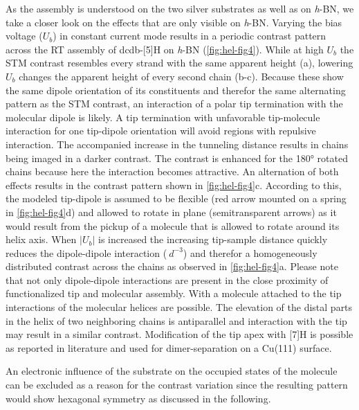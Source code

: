 As the assembly is understood on the two silver substrates as well as on \textit{h}-BN, we take a closer look on the effects that are only visible on \textit{h}-BN. Varying the bias voltage ($U_b$) in constant current mode results in a periodic contrast pattern across the RT assembly of dcdb-[5]H on \textit{h}-BN (\autoref{fig:hel-fig4}). While at high $U_b$ the STM contrast resembles every strand with the same apparent height (a), lowering $U_b$ changes the apparent height of every second chain (b-c). Because these show the same dipole orientation of its constituents and therefor the same alternating pattern as the STM contrast, an interaction of a polar tip termination with the molecular dipole is likely. A tip termination with unfavorable tip-molecule interaction for one tip-dipole orientation will avoid regions with repulsive interaction. The accompanied increase in the tunneling distance results in chains being imaged in a darker contrast. The contrast is enhanced for the 180° rotated chains because here the interaction becomes attractive. An alternation of both effects results in the contrast pattern shown in \autoref{fig:hel-fig4}c. According to this, the modeled tip-dipole is assumed to be flexible (red arrow mounted on a spring in \autoref{fig:hel-fig4}d) and allowed to rotate in plane (semitransparent arrows) as it would result from the pickup of a molecule that is allowed to rotate around its helix axis. When $|U_b|$ is increased the increasing tip-sample distance quickly reduces the dipole-dipole interaction ($~d^{-3}$) and therefor a homogeneously distributed contrast across the chains as observed in \autoref{fig:hel-fig4}a. Please note that not only dipole-dipole interactions are present in the close proximity of functionalized tip and molecular assembly. With a molecule attached to the tip  interactions of the molecular helices are possible. The elevation of the distal parts in the helix of two neighboring chains is antiparallel and interaction with the tip may result in a similar contrast. Modification of the tip apex with [7]H is possible as reported in literature\cite{Ernst_Stereochemical_2016} and used for dimer-separation on a Cu(111) surface.

An electronic influence of the substrate on the occupied states of the molecule can be excluded as a reason for the contrast variation since the resulting pattern would show hexagonal symmetry as discussed in the following.

